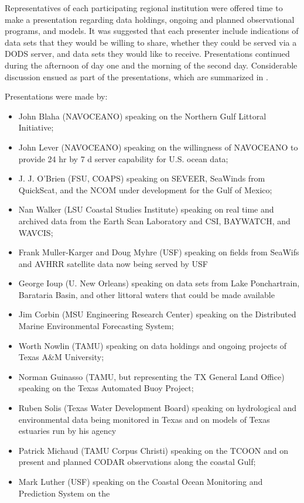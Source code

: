 Representatives of each participating regional institution were offered time to make a 
presentation regarding data holdings, ongoing and planned observational programs, and models. 
It was suggested that each presenter include indications of data sets that they would be willing to 
share, whether they could be served via a DODS server, and data sets they would like to receive. 
Presentations continued during the afternoon of day one and the morning of the second day. 
Considerable discussion ensued as part of the presentations, which are
summarized in .

Presentations were made by:
\begin{itemize}
\item John Blaha (NAVOCEANO) speaking on the Northern Gulf Littoral
  Initiative;
\item John Lever (NAVOCEANO) speaking on the willingness of NAVOCEANO
  to provide 24 hr by 7 d server capability for U.S. ocean data;
\item J. J. O'Brien (FSU, COAPS) speaking on SEVEER, SeaWinds from QuickScat, and the 
NCOM under development for the Gulf of Mexico;
\item Nan Walker (LSU Coastal Studies Institute) speaking on real time and archived data from 
the Earth Scan Laboratory and CSI, BAYWATCH, and WAVCIS;
\item Frank Muller-Karger and Doug Myhre (USF) speaking on fields from SeaWifs and AVHRR 
satellite data now being served by USF
\item George Ioup (U. New Orleans) speaking on data sets from Lake Ponchartrain, Barataria 
Basin, and other littoral waters that could be made available
\item Jim Corbin (MSU Engineering Research Center) speaking on the Distributed Marine 
Environmental Forecasting System;
\item Worth Nowlin (TAMU) speaking on data holdings and ongoing projects of Texas A\&M 
University;
\item Norman Guinasso (TAMU, but representing the TX General Land Office) speaking on the 
Texas Automated Buoy Project;
\item Ruben Solis (Texas Water Development Board) speaking on hydrological and environmental 
data being monitored in Texas and on models of Texas estuaries run by
his agency
\item Patrick Michaud (TAMU Corpus Christi) speaking on the TCOON and on present and 
planned CODAR observations along the coastal Gulf;
\item Mark Luther (USF) speaking on the Coastal Ocean Monitoring and Prediction System on the 

\end{itemize}
